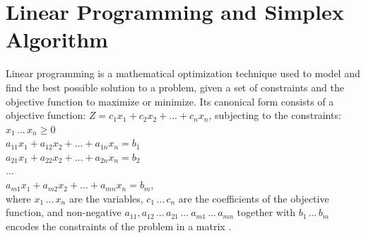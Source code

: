 \documentclass[logo,bsc,singlespacing,parskip]{infthesis}
\begin{document}
\section{Linear Programming and Simplex Algorithm}
\label{simplex}
Linear programming is a mathematical optimization technique used to model and
find the best possible solution to a problem, given a set of constraints and 
the objective function to maximize or minimize. Its canonical form consists of a
objective function:
\begin{math}
Z = c_1x_1 + c_2x_2 + ... + c_nx_n
\end{math}, subjecting to the constraints: \\
\begin{math}
x_1 \, ... \, x_n \ge 0
\end{math}\\
\begin{math}
a_{11}x_1 + a_{12}x_2 + ... + a_{1n}x_n = b_1 
\end{math}\\
\begin{math}
a_{21}x_1 + a_{22}x_2 + ... + a_{2n}x_n = b_2
\end{math}\\
\begin{math}
...
\end{math}\\
\begin{math}
a_{m1}x_1 + a_{m2}x_2 + ... + a_{mn}x_n = b_m
\end{math}, \\
where \begin{math}x_1 \,...\, x_n\end{math} are the variables, 
\begin{math}c_1 \,...\, c_n\end{math} are the coefficients of the objective function, 
and non-negative \begin{math}a_{11}, a_{12} \,...\, a_{21} \,...\ a_{m1} \,...\, a_{mn}\end{math}
together with \begin{math}b_1 \,...\, b_m\end{math} encodes the constraints of
the problem in a matrix \cite{FPL1}. 

    
\end{document}
